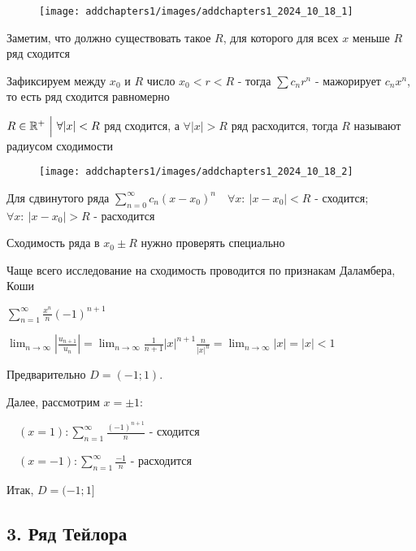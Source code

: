 \documentclass[12pt]{article}
\begin{document}
    \begin{minipage}{\textwidth}
        \begin{wrapfigure}{r}{0pt}
            \texttt{[image: addchapters1/images/addchapters1\_2024\_10\_18\_1]}
        \end{wrapfigure}

        \Nota Заметим, что должно существовать такое $R$, для которого для всех $x$ меньше $R$ ряд сходится

        Зафиксируем между $x_0$ и $R$ число $x_0 < r < R$ - тогда $\sum c_n r^n$ - мажорирует $c_n x^n$, то есть ряд сходится равномерно

        \hypertarget{convergenceradius}{}

        \Def $R \in \mathbb{R}^+ \ \Big| \ \forall |x| < R $ ряд сходится, а $\forall |x| > R$ ряд расходится, тогда $R$ называют радиусом сходимости
        
        \begin{wrapfigure}{r}{0pt}
            \texttt{[image: addchapters1/images/addchapters1\_2024\_10\_18\_2]}
        \end{wrapfigure}

        Для сдвинутого ряда $\sum_{n = 0}^\infty c_n (x - x_0)^n \quad \forall x: \ |x - x_0| < R$ - сходится; $\forall x: \ |x - x_0| > R$ - расходится
        
        Сходимость ряда в $x_0 \pm R$ нужно проверять специально

        \Nota Чаще всего исследование на сходимость проводится по признакам Даламбера, Коши

        \Ex $\sum_{n = 1}^\infty \frac{x^n}{n} (-1)^{n + 1}$

    \end{minipage}


    $\lim_{n \to \infty} \left|\frac{u_{n+1}}{u_n}\right| = \lim_{n \to \infty} \frac{1}{n + 1} |x|^{n + 1} \frac{n}{|x|^n} = \lim_{n \to \infty} |x| = |x| < 1$

    Предварительно $D = (-1; 1)$. 
    
    Далее, рассмотрим $x = \pm 1$: 
    
    $\quad (x = 1): \sum_{n = 1}^\infty \frac{(-1)^{n + 1}}{n}$ - сходится

    $\quad (x = -1): \sum_{n = 1}^\infty \frac{-1}{n}$ - расходится

    Итак, $D = (-1; 1]$

    \subsection{3. Ряд Тейлора}
\end{document}
